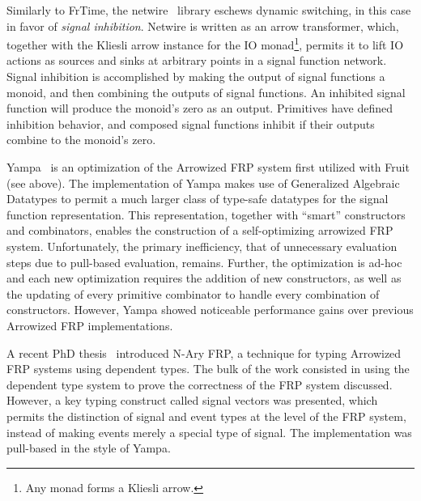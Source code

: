 Similarly to FrTime, the netwire~\cite{Soylemez} library eschews dynamic switching, in this case in favor of {\em signal inhibition}. Netwire is written as an arrow
transformer, which, together with the Kliesli arrow instance for the IO monad\footnote{Any monad forms a Kliesli arrow.}, permits it to lift IO actions as sources and
sinks at arbitrary points in a signal function network. Signal inhibition is accomplished by making the output of signal functions a monoid, and then combining the
outputs of signal functions. An inhibited signal function will produce the monoid's zero as an output. Primitives have defined inhibition behavior, and composed signal
functions inhibit if their outputs combine to the monoid's zero.

Yampa~\cite{Nilsson2005} is an optimization of the Arrowized FRP system first utilized with Fruit (see above). The implementation of Yampa makes use of Generalized 
Algebraic Datatypes to permit a much larger class of type-safe datatypes for the signal function representation. This representation, together with ``smart''
constructors and combinators, enables the construction of a self-optimizing arrowized FRP system. Unfortunately, the primary inefficiency, that of unnecessary evaluation
steps due to pull-based evaluation, remains. Further, the optimization is ad-hoc and each new optimization requires the addition of new constructors, as well
as the updating of every primitive combinator to handle every combination of constructors. However, Yampa showed noticeable performance gains over previous Arrowized FRP 
implementations.

A recent PhD thesis~\cite{Sculthorpe2011} introduced N-Ary FRP, a technique for typing Arrowized FRP systems using dependent types. The bulk of the work consisted
in using the dependent type system to prove the correctness of the FRP system discussed. However, a key typing construct called signal vectors was presented,
which permits the distinction of signal and event types at the level of the FRP system, instead of making events merely a special type of signal. The implementation
was pull-based in the style of Yampa.